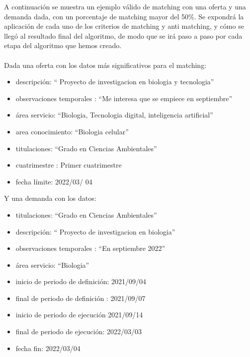 \documentclass[11pt]{article}
\begin{document}
   A continuación se muestra un ejemplo válido de matching con una oferta y una demanda dada, con un porcentaje de matching mayor del 50\%. Se expondrá la aplicación de cada uno de los criterios de matching y anti matching, y cómo se llegó al resultado final del algoritmo, de modo que se irá paso a paso por cada etapa del algoritmo que hemos creado.\\\\
  Dada una oferta con los datos más significativos para el matching:\\
  \begin{itemize} 
  	\item descripción: “ Proyecto de investigacion en biologia y tecnologia”
  	\item observaciones temporales : “Me interesa que se empiece en septiembre”
  	\item área servicio: “Biologia, Tecnologia digital, inteligencia artificial”
  	\item  area conocimiento: “Biologia celular”
  	\item titulaciones: “Grado en Ciencias Ambientales”
  	\item cuatrimestre : Primer cuatrimestre
  	\item  fecha límite: 2022/03/ 04
  	\\
  \end{itemize}
  Y una demanda con los datos:\\
  \begin{itemize} 
  	\item titulaciones: “Grado en Ciencias Ambientales”
  	\item descripción: “ Proyecto de investigacion en biologia”
  	\item observaciones temporales : “En septiembre 2022”
  	\item área servicio: “Biologia”
    \item inicio de periodo de definición: 2021/09/04
    \item final de periodo de definición : 2021/09/07
    \item inicio de periodo de ejecución 2021/09/14
    \item final de periodo de ejecución: 2022/03/03
    \item fecha fin: 2022/03/04
  \end{itemize}
\end{document}

